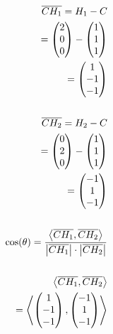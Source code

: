 \begin{align*}
    \overline{CH_1} = H_1 - C \\
    = \begin{pmatrix}
        2 \\ 0 \\ 0
    \end{pmatrix} - \begin{pmatrix}
        1 \\ 1 \\ 1
    \end{pmatrix} \\
    = \begin{pmatrix}
        1 \\ -1 \\ -1
    \end{pmatrix} \\\\
    \overline{CH_2} = H_2 - C \\
    = \begin{pmatrix}
        0 \\ 2 \\ 0
    \end{pmatrix} - \begin{pmatrix}
        1 \\ 1 \\ 1
    \end{pmatrix} \\
    = \begin{pmatrix}
        -1 \\ 1 \\ -1
    \end{pmatrix} \\\\ \pagebreak[2]
    \cos(\theta) = \frac{\left\langle \overline{CH_1}, \overline{CH_2} \right\rangle}{\left|\overline{CH_1}\right| \cdot \left|\overline{CH_2}\right|} \\\\
    \left\langle \overline{CH_1}, \overline{CH_2} \right\rangle  \\
    = \left\langle \begin{pmatrix}
        1 \\ -1 \\ -1
    \end{pmatrix}, \begin{pmatrix}
        -1 \\ 1 \\ -1
    \end{pmatrix} \right\rangle  \\

\end{align*}
